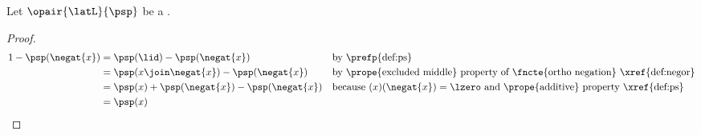 \begin{proposition}
\label{prop:ps_ortho_xy}
Let $\opair{\latL}{\psp}$ be a  .
\end{proposition}
\begin{proof}
    \begin{align*}
      1-\psp(\negat{x})
        &= \psp(\lid)-\psp(\negat{x})
        && \text{by \prefp{def:ps}}
      \\&= \psp(x\join\negat{x})-\psp(\negat{x})
        && \text{by \prope{excluded middle} property of \fncte{ortho negation} \xref{def:negor}}
      \\&= \psp(x)+\psp(\negat{x})-\psp(\negat{x})
        && \text{because $(x)(\negat{x})=\lzero$ and \prope{additive} property \xref{def:ps}}
      \\&= \psp(x)
    \end{align*}
\end{proof}

